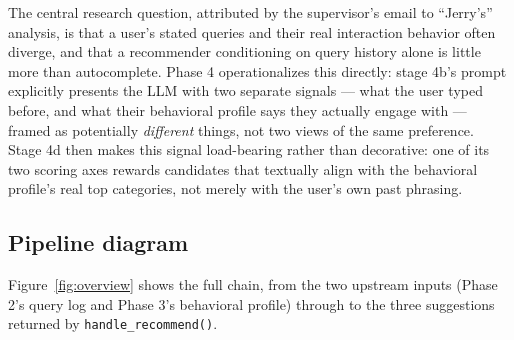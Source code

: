 \documentclass[11pt,a4paper]{article}
\newcommand{\code}[1]{\texttt{#1}}
\begin{document}
The central research question, attributed by the supervisor's email to ``Jerry's'' analysis, is
that a user's stated queries and their real interaction behavior often diverge, and that a
recommender conditioning on query history alone is little more than autocomplete. Phase 4
operationalizes this directly: stage 4b's prompt explicitly presents the LLM with two separate
signals --- what the user typed before, and what their behavioral profile says they actually
engage with --- framed as potentially \emph{different} things, not two views of the same
preference. Stage 4d then makes this signal load-bearing rather than decorative: one of its two
scoring axes rewards candidates that textually align with the behavioral profile's real top
categories, not merely with the user's own past phrasing.

\subsection{Pipeline diagram}

Figure~\ref{fig:overview} shows the full chain, from the two upstream inputs (Phase 2's query log
and Phase 3's behavioral profile) through to the three suggestions returned by
\code{handle\_recommend()}.
\end{document}
